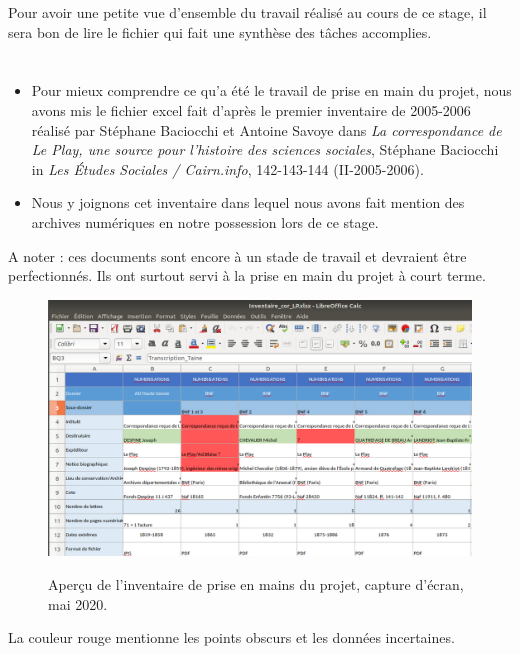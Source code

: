 Pour avoir une petite vue d'ensemble du travail réalisé au cours de ce stage, il sera bon de lire le fichier  qui fait une synthèse des tâches accomplies.

\section{}

\begin{itemize}
    \item Pour mieux comprendre ce qu'a été le travail de prise en main du projet, nous avons mis le fichier excel  fait d'après le premier inventaire de 2005-2006 réalisé par Stéphane Baciocchi et Antoine Savoye dans \emph{La correspondance de Le Play, une source pour l'histoire des sciences sociales}, Stéphane Baciocchi in \emph{Les Études Sociales / Cairn.info}, 142-143-144 (II-2005-2006).
    \item Nous y joignons cet inventaire  dans lequel nous avons fait mention des archives numériques en notre possession lors de ce stage.
\end{itemize}

A noter : ces documents sont encore à un stade de travail et devraient être perfectionnés. Ils ont surtout servi à la prise en main du projet à court terme.

\begin{figure}[ht]
    \centering
    \caption{Aperçu de l'inventaire de prise en mains du projet, capture d'écran, mai 2020.}
    \includegraphics[width=14cm]{images/inventaire.png}
    \label{inventaire}
\end{figure}
La couleur rouge mentionne les points obscurs et les données incertaines.

